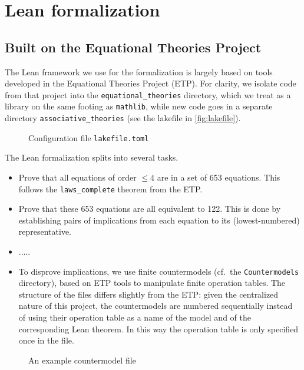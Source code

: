 \section{Lean formalization}

\subsection{Built on the Equational Theories Project}

The Lean framework we use for the formalization is largely based on tools developed in the Equational Theories Project (ETP\@).
For clarity, we isolate code from that project into the \texttt{equational\_theories} directory, which we treat as a library on the same footing as \texttt{mathlib}, while new code goes in a separate directory \texttt{associative\_theories} (see the lakefile in \autoref{fig:lakefile}).

\begin{figure}

\caption{\label{fig:lakefile}Configuration file \texttt{lakefile.toml}}
\end{figure}

The Lean formalization splits into several tasks.
\begin{itemize}
\item Prove that all equations of order $\leq 4$ are in a set of \num{653} equations.  This follows the \texttt{laws\_complete} theorem from the ETP\@.

\item Prove that these \num{653} equations are all equivalent to \num{122}.  This is done by establishing pairs of implications from each equation to its (lowest-numbered) representative.

\item .....

\item To disprove implications, we use finite countermodels (cf.\ the \texttt{Countermodels} directory), based on ETP tools to manipulate finite operation tables.  The structure of the files differs slightly from the ETP: given the centralized nature of this project, the countermodels are numbered sequentially instead of using their operation table as a name of the model and of the corresponding Lean theorem.  In this way the operation table is only specified once in the file.
\end{itemize}

\begin{figure}

\caption{\label{fig:lakefile}An example countermodel file}
\end{figure}

